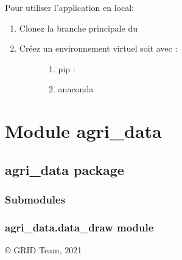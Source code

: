 \documentclass[letterpaper,10pt,french]{sphinxmanual}
\begin{document}
\sphinxAtStartPar
Pour utiliser l’application en local:
\begin{enumerate}
%
\item {} 
\sphinxAtStartPar
Clonez la branche principale du 

\item {} \begin{description}
\item[{Créez un environnement virtuel soit avec :}] \leavevmode\begin{enumerate}
%
\item {} 
\sphinxAtStartPar
pip : 

\item {} 
\sphinxAtStartPar
anaconda 

\end{enumerate}

\end{description}

\end{enumerate}


\section{Module agri\_data}
\label{\detokenize{modules:module-agri-data}}\label{\detokenize{modules:agri}}\label{\detokenize{modules::doc}}

\subsection{agri\_data package}
\label{\detokenize{agri_data:agri-data-package}}\label{\detokenize{agri_data::doc}}

\subsubsection{Submodules}
\label{\detokenize{agri_data:submodules}}

\subsubsection{agri\_data.data\_draw module}
\label{\detokenize{agri_data:module-agri_data.data_draw}}\label{\detokenize{agri_data:agri-data-data-draw-module}}
\sphinxAtStartPar
© GRID Team, 2021
\end{document}
